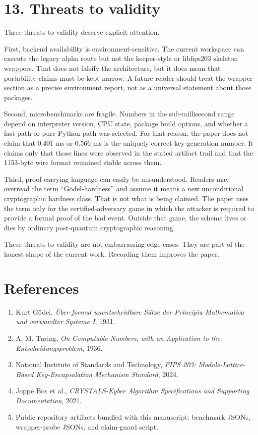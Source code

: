 \documentclass[
  11pt,
]{article}
\providecommand{\tightlist}{%
  \setlength{\itemsep}{0pt}\setlength{\parskip}{0pt}}
\begin{document}
\section{13. Threats to validity}\label{threats-to-validity}

Three threats to validity deserve explicit attention.

First, backend availability is environment-sensitive. The current
workspace can execute the legacy alpha route but not the keeper-style or
libfips203 skeleton wrappers. That does not falsify the architecture,
but it does mean that portability claims must be kept narrow. A future
reader should treat the wrapper section as a precise environment report,
not as a universal statement about those packages.

Second, microbenchmarks are fragile. Numbers in the sub-millisecond
range depend on interpreter version, CPU state, package build options,
and whether a fast path or pure-Python path was selected. For that
reason, the paper does not claim that 0.401 ms or 0.566 ms is the
uniquely correct key-generation number. It claims only that those lines
were observed in the stated artifact trail and that the 1153-byte wire
format remained stable across them.

Third, proof-carrying language can easily be misunderstood. Readers may
overread the term ``Gödel-hardness'' and assume it means a new
unconditional cryptographic hardness class. That is not what is being
claimed. The paper uses the term only for the certified-adversary game
in which the attacker is required to provide a formal proof of the bad
event. Outside that game, the scheme lives or dies by ordinary
post-quantum cryptographic reasoning.

These threats to validity are not embarrassing edge cases. They are part
of the honest shape of the current work. Recording them improves the
paper.

\section{References}\label{references}

\begin{enumerate}
\def\labelenumi{\arabic{enumi}.}
\tightlist
\item
  Kurt Gödel, \emph{Über formal unentscheidbare Sätze der Principia
  Mathematica und verwandter Systeme I}, 1931.
\item
  A. M. Turing, \emph{On Computable Numbers, with an Application to the
  Entscheidungsproblem}, 1936.
\item
  National Institute of Standards and Technology, \emph{FIPS 203:
  Module-Lattice-Based Key-Encapsulation Mechanism Standard}, 2024.
\item
  Joppe Bos et al., \emph{CRYSTALS-Kyber Algorithm Specifications and
  Supporting Documentation}, 2021.
\item
  Public repository artifacts bundled with this manuscript: benchmark
  JSONs, wrapper-probe JSONs, and claim-guard script.
\end{enumerate}
\end{document}
